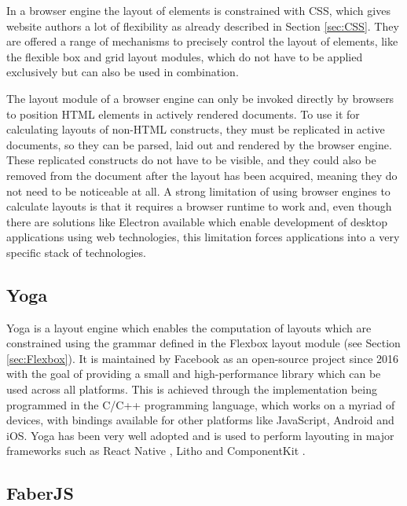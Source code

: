 In a browser engine the layout of elements is constrained with CSS,
which gives website authors a lot of flexibility as already described
in Section \ref{sec:CSS}.  They are offered a range of mechanisms to
precisely control the layout of elements, like the flexible box and
grid layout modules, which do not have to be applied exclusively but
can also be used in combination.

The layout module of a browser engine can only be invoked directly by browsers to position HTML elements in actively rendered documents. 
To use it for calculating layouts of non-HTML constructs, they must be replicated in active documents, so they can be parsed, laid out and rendered by the browser engine. 
These replicated constructs do not have to be visible, and they could also be removed from the document after the layout has been acquired, meaning they do not need to be noticeable at all. 
A strong limitation of using browser engines to calculate layouts is that it requires a browser runtime to work and, even though there are solutions like Electron available which enable development of desktop applications using web technologies, this limitation forces applications into a very specific stack of technologies. 

\subsection{Yoga}
\label{sec:Yoga}

Yoga \parencite{Yoga} is a layout engine which enables the computation of layouts which are constrained using the grammar defined in the Flexbox layout module (see Section \ref{sec:Flexbox}). 
It is maintained by Facebook as an open-source project since 2016 \parencite{YogaRelease} with the goal of providing a small and high-performance library which can be used across all platforms. 
This is achieved through the implementation being programmed in the C/C++ programming language, which works on a myriad of devices, with bindings available for other platforms like JavaScript, Android and iOS.
Yoga has been very well adopted and is used to perform layouting in major frameworks such as React Native \parencite{ReactNative}, Litho \parencite{Litho} and ComponentKit \parencite{ComponentKit}.

\subsection{FaberJS}
\label{sec:FaberJS}

